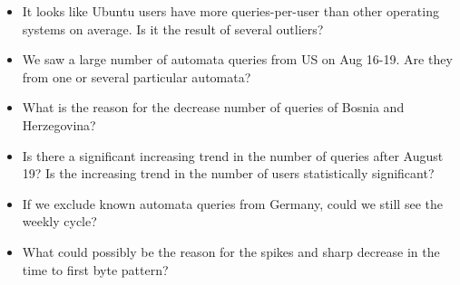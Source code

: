 \documentclass[12pt,]{article}
\providecommand{\tightlist}{%
  \setlength{\itemsep}{0pt}\setlength{\parskip}{0pt}}
\begin{document}
\begin{itemize}
\tightlist
\item
  It looks like Ubuntu users have more queries-per-user than other
  operating systems on average. Is it the result of several outliers?
\item
  We saw a large number of automata queries from US on Aug 16-19. Are
  they from one or several particular automata?
\item
  What is the reason for the decrease number of queries of Bosnia and
  Herzegovina?
\item
  Is there a significant increasing trend in the number of queries after
  August 19? Is the increasing trend in the number of users
  statistically significant?
\item
  If we exclude known automata queries from Germany, could we still see
  the weekly cycle?
\item
  What could possibly be the reason for the spikes and sharp decrease in
  the time to first byte pattern?
\end{itemize}
\end{document}
